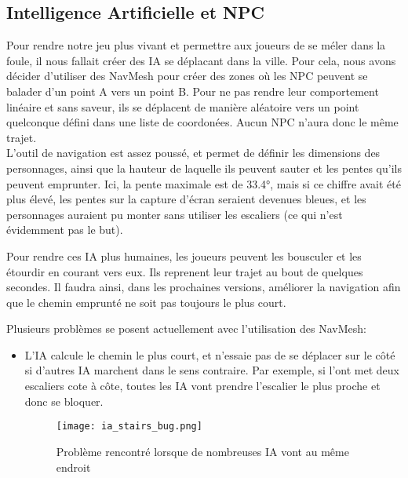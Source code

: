 \subsection{Intelligence Artificielle et NPC}

Pour rendre notre jeu plus vivant et permettre aux joueurs de se méler dans la foule,
il nous fallait créer des IA se déplacant dans la ville.
Pour cela, nous avons décider d'utiliser des NavMesh pour créer des zones où les 
NPC peuvent se balader d'un point A vers un point B.
Pour ne pas rendre leur comportement linéaire et sans saveur,
ils se déplacent de manière aléatoire  vers un point quelconque défini dans une liste de coordonées.
Aucun NPC n'aura donc le même trajet.\\

L’outil de navigation est assez poussé, et permet de définir les dimensions des personnages,
ainsi que la hauteur de laquelle ils peuvent sauter et les pentes qu’ils peuvent emprunter.
Ici, la pente maximale est de 33.4°, mais si ce chiffre avait été plus élevé,
les pentes sur la capture d’écran seraient devenues bleues, et les personnages auraient pu
monter sans utiliser les escaliers (ce qui n’est évidemment pas le but).


Pour rendre ces IA plus humaines, les joueurs peuvent les bousculer et les étourdir en courant vers eux.
Ils reprenent leur trajet au bout de quelques secondes. Il faudra ainsi, dans les prochaines versions, améliorer la navigation afin que le chemin emprunté ne soit pas toujours le plus court. 


Plusieurs problèmes se posent actuellement avec l'utilisation des NavMesh:
\begin{itemize}
    \item L'IA calcule le chemin le plus court, et n'essaie pas de se déplacer sur le côté si d'autres IA marchent dans le sens contraire.
    Par exemple, si l'ont met deux escaliers cote à côte, toutes les IA vont prendre l'escalier le plus proche et donc se bloquer.\\
    \begin{figure}[hbt!]
        \centering
        \texttt{[image: ia\_stairs\_bug.png]}
        \caption{Problème rencontré lorsque de nombreuses IA vont au même endroit}
    \end{figure}
\end{itemize}